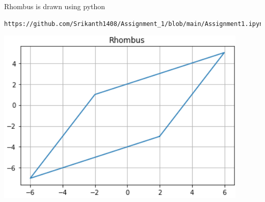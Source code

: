 \documentclass{article}
\begin{document}
{Rhombus is drawn using python}
\begin{lstlisting}
https://github.com/Srikanth1408/Assignment_1/blob/main/Assignment1.ipynb
\end{lstlisting}
\includegraphics{rhombus}
\end{document}

